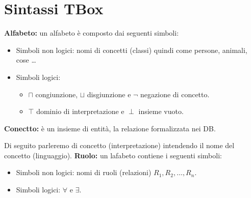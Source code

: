 \documentclass[../main.tex]{subfiles}
\begin{document}
   \section{Sintassi TBox}
   \textbf{Alfabeto:} un alfabeto è composto dai seguenti simboli:
   \begin{itemize}
      \item Simboli non logici: nomi di concetti (classi) quindi come persone, animali, cose \dots
      \item Simboli logici: 
         \begin{itemize}
            \item $\sqcap$ congiunzione, $\sqcup$ disgiunzione e $\lnot$ negazione di concetto.
            \item $\top$ dominio di interpretazione e $\perp$ insieme vuoto.
         \end{itemize}
   \end{itemize}
   \textbf{Conectto:} è un insieme di entità, la relazione formalizzata nei DB.

   Di seguito parleremo di concetto (interpretazione) intendendo il nome del concetto (linguaggio). 
   \spazio
   \textbf{Ruolo:} un lafabeto contiene i seguenti simboli:
   \begin{itemize}
      \item Simboli non logici: nomi di ruoli (relazioni) $R_1, R_2, \dots , R_n$.
      \item Simboli logici: $\forall$ e $\exists$.
   \end{itemize}
\end{document}
